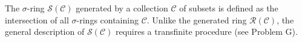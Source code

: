 The $\sigma$-ring $\mathcal{S}(\mathcal{C})$ generated by a collection $\mathcal{C}$ of subsets is defined as the intersection of all $\sigma$-rings containing $\mathcal{C}$. Unlike the generated ring $\mathcal{R}(\mathcal{C})$, the general description of $\mathcal{S}(\mathcal{C})$ requires a transfinite procedure (see Problem G).
